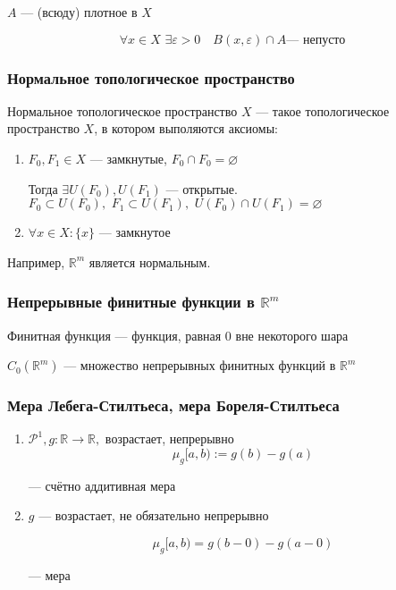 \documentclass{article}
\def\dbl{\,\,}
\begin{document}
$A$ --- (всюду) плотное в $X$

\[\forall x \in X \dbl \exists \varepsilon > 0 \quad B(x, \varepsilon) \cap A\text{--- непусто}\]

\subsubsection{Нормальное топологическое пространство}

Нормальное топологическое пространство $X$ --- такое топологическое пространство $X$, в котором выполяются аксиомы:

\begin{enumerate}
    \item $F_0, F_1 \in X$ --- замкнутые, $F_0 \cap F_0 = \varnothing$
    
    Тогда $\exists U(F_0), U(F_1)$ --- открытые. $F_0 \subset U(F_0), \dbl F_1 \subset U(F_1), \dbl U(F_0) \cap U(F_1) = \varnothing$

    \item $\forall x \in X: \{x\}$ --- замкнутое
\end{enumerate}

Например, $\mathbb{R}^m$ является нормальным.

\subsubsection{Непрерывные финитные функции в $\mathbb{R}^m$}

Финитная функция --- функция, равная 0 вне некоторого шара

$C_0(\mathbb{R}^m)$ --- множество непрерывных финитных функций в $\mathbb{R}^m$

\subsubsection{Мера Лебега-Стилтьеса, мера Бореля-Стилтьеса}

\begin{enumerate}
    \item $\mathcal{P}^{1}, g: \mathbb{R} \rightarrow \mathbb{R}, $ возрастает, непрерывно
    \[\mu_g[a, b) := g(b) - g(a)\]

    --- счётно аддитивная мера
    \item $g$ --- возрастает, не обязательно непрерывно
    
    \[\mu_g[a, b) = g(b - 0) - g(a - 0)\]

    --- мера
\end{enumerate}
\end{document}
